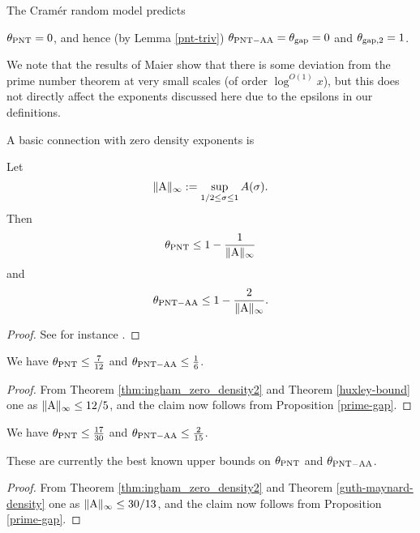 The Cram\'er random model \cite{cramer} predicts

\begin{conjecture} $\theta_{\mathrm{PNT}} = 0$, and hence (by Lemma \ref{pnt-triv}) $\theta_{\mathrm{PNT-AA}} = \theta_{\mathrm{gap}}=0$ and $\theta_{\mathrm{gap},2}=1$.
\end{conjecture}

We note that the results of Maier \cite{maier-primes} show that there is some deviation from the prime number theorem at very small scales (of order $\log^{O(1)} x$), but this does not directly affect the exponents discussed here due to the epsilons in our definitions.

A basic connection with zero density exponents is

\begin{proposition}\label{prime-gap}  Let
\begin{equation}\label{A-def}
    \|\mathrm{A}\|_\infty := \sup_{1/2 \leq \sigma \leq 1} A(\sigma).
\end{equation}
Then
    $$ \theta_{\mathrm{PNT}} \leq 1 - \frac{1}{\|\mathrm{A}\|_\infty}$$
    and
    $$ \theta_{\mathrm{PNT-AA}} \leq 1 - \frac{2}{\|\mathrm{A}\|_\infty}.$$
\end{proposition}

\begin{proof} See for instance \cite[\S 13.2]{guth-maynard}.
\end{proof}

\begin{corollary}  We have $\theta_{\mathrm{PNT}} \leq \frac{7}{12}$ and $\theta_{\mathrm{PNT-AA}} \leq \frac{1}{6}$.
\end{corollary}

\begin{proof}  From Theorem \ref{thm:ingham_zero_density2} and Theorem \ref{huxley-bound} one as $\|\mathrm{A}\|_\infty \leq 12/5$, and the claim now follows from Proposition \ref{prime-gap}.
\end{proof}

\begin{corollary}\cite{guth-maynard}  We have $\theta_{\mathrm{PNT}} \leq \frac{17}{30}$ and $\theta_{\mathrm{PNT-AA}} \leq \frac{2}{15}$.
\end{corollary}

These are currently the best known upper bounds on $\theta_{\mathrm{PNT}}$ and $\theta_{\mathrm{PNT-AA}}$.

\begin{proof}  From Theorem \ref{thm:ingham_zero_density2} and Theorem \ref{guth-maynard-density} one as $\|\mathrm{A}\|_\infty \leq 30/13$, and the claim now follows from Proposition \ref{prime-gap}.
\end{proof}

